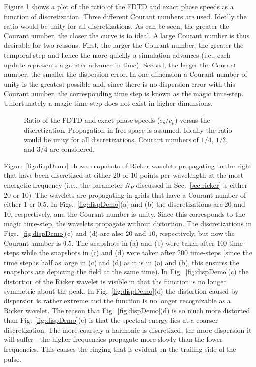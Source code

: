 Figure \ref{fig:dispError} shows a plot of the ratio of the FDTD and
exact phase speeds as a function of discretization.  Three different
Courant numbers are used.  Ideally the ratio would be unity for all
discretizations.  As can be seen, the greater the Courant number, the
closer the curve is to ideal.  A large Courant number is thus
desirable for two reasons.  First, the larger the Courant number, the
greater the temporal step and hence the more quickly a simulation
advances (i.e., each update represents a greater advance in time).
Second, the larger the Courant number, the smaller the dispersion
error.  In one dimension a Courant number of unity is the greatest
possible and, since there is no dispersion error with this Courant
number, the corresponding time step is known as the magic time-step.
Unfortunately a magic time-step does not exist in higher dimensions.

\begin{figure}
  \begin{center}
  \end{center}
  \caption{Ratio of the FDTD and exact phase speeds
  ($\tilde{c}_p/c_p$) versus the discretization.  Propagation in free
  space is assumed.  Ideally the ratio would be unity for all
  discretizations.  Courant numbers of $1/4$, $1/2$, and $3/4$ are
  considered.}  \label{fig:dispError}
\end{figure}

Figure \ref{fig:dispDemo} shows snapshots of Ricker wavelets
propagating to the right that have been discretized at either $20$ or
$10$ points per wavelength at the most energetic frequency (i.e., the
parameter $N_P$ discussed in Sec.\ \ref{sec:ricker} is either $20$ or $10$).
The wavelets are propagating in grids that have a Courant number of
either $1$ or $0.5$.  In Figs.\ \ref{fig:dispDemo}(a) and (b) the
discretizations are $20$ and $10$, respectively, and the Courant
number is unity.  Since this corresponds to the magic time-step, the
wavelets propagate without distortion.  The discretizations in
Figs.\ \ref{fig:dispDemo}(c) and (d) are also $20$ and $10$,
respectively, but now the Courant number is $0.5$.  The snapshots in
(a) and (b) were taken after $100$ time-steps while the snapshots in
(c) and (d) were taken after $200$ time-steps (since the time step is
half as large in (c) and (d) as it is in (a) and (b), this ensures the
snapshots are depicting the field at the same time).  In
Fig.\ \ref{fig:dispDemo}(c) the distortion of the Ricker wavelet is
visible in that the function is no longer symmetric about the peak.
In Fig.\ \ref{fig:dispDemo}(d) the distortion caused by dispersion is
rather extreme and the function is no longer recognizable as a Ricker
wavelet.  The reason that Fig.\ \ref{fig:dispDemo}(d) is so much more
distorted than Fig.\ \ref{fig:dispDemo}(c) is that the spectral energy
lies at a coarser discretization.  The more coarsely a harmonic is
discretized, the more dispersion it will suffer---the higher
frequencies propagate more slowly than the lower frequencies.  This
causes the ringing that is evident on the trailing side of the pulse.

